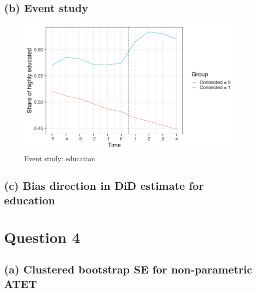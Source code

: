 \documentclass{scrartcl}
\begin{document}

\subsection*{(b) Event study}

\begin{figure}[h!]
    \centering
    \includegraphics[width=0.75\linewidth]{output/figures/2_event_study.png}
    \caption{Event study: education}
    \label{fig:eventstudy}
\end{figure}


\subsection*{(c) Bias direction in DiD estimate for education}


\section*{Question 4}

\subsection*{(a) Clustered bootstrap SE for non-parametric ATET}



\end{document}
